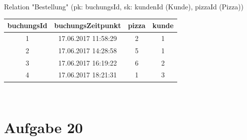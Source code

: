 Relation "Bestellung" (pk: buchungsId, sk: kundenId (Kunde), pizzaId (Pizza))\\
\begin{tabular} {|c|c|c|c|}
	\rowcolor{Gray}\hline
	buchungsId&buchungsZeitpunkt \phantom{a}&pizza&kunde\\\hline
	1&17.06.2017 11:58:29&2&1\\\hline
	2&17.06.2017 14:28:58&5&1\\\hline
	3&17.06.2017 16:19:22&6&2\\\hline
	4&17.06.2017 18:21:31&1&3\\\hline
\end{tabular}\\
\pagebreak

\pagebreak

\pagebreak

\pagebreak
\section*{Aufgabe 20}

